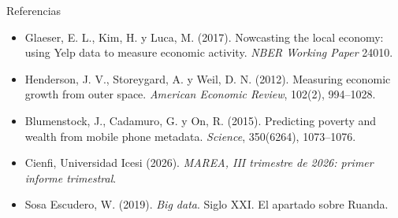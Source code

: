 \documentclass{beamer}
\begin{document}
\begin{frame}{Referencias}
\small
\begin{itemize}\itemsep4pt
  \item Glaeser, E. L., Kim, H. y Luca, M. (2017). Nowcasting the local economy: using Yelp data to measure economic activity. \emph{NBER Working Paper} 24010.
  \item Henderson, J. V., Storeygard, A. y Weil, D. N. (2012). Measuring economic growth from outer space. \emph{American Economic Review}, 102(2), 994--1028.
  \item Blumenstock, J., Cadamuro, G. y On, R. (2015). Predicting poverty and wealth from mobile phone metadata. \emph{Science}, 350(6264), 1073--1076.
  \item Cienfi, Universidad Icesi (2026). \emph{MAREA, III trimestre de 2026: primer informe trimestral}.
  \item Sosa Escudero, W. (2019). \emph{Big data}. Siglo XXI. El apartado sobre Ruanda.
\end{itemize}
\end{frame}
\end{document}
